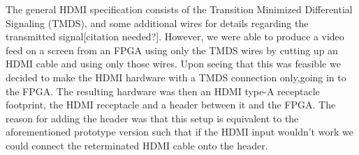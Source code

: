 \documentclass[../main/report.tex]{subfiles}
\begin{document}
The general HDMI specification consists of the Transition Minimized Differential Signaling (TMDS), and some additional wires for details regarding the transmitted signal[citation needed?].
However, we were able to produce a video feed on a screen from an FPGA using only the TMDS wires by cutting up an HDMI cable and using only those wires.
Upon seeing that this was feasible we decided to make the HDMI hardware with a TMDS connection only,going in to the FPGA. The resulting hardware was then an HDMI type-A receptacle footprint, the HDMI receptacle and a header between it and the FPGA.
The reason for adding the header was that this setup is equivalent to the aforementioned prototype version such that if the HDMI input wouldn't work we could connect the reterminated HDMI cable onto the header.
\end{document}
